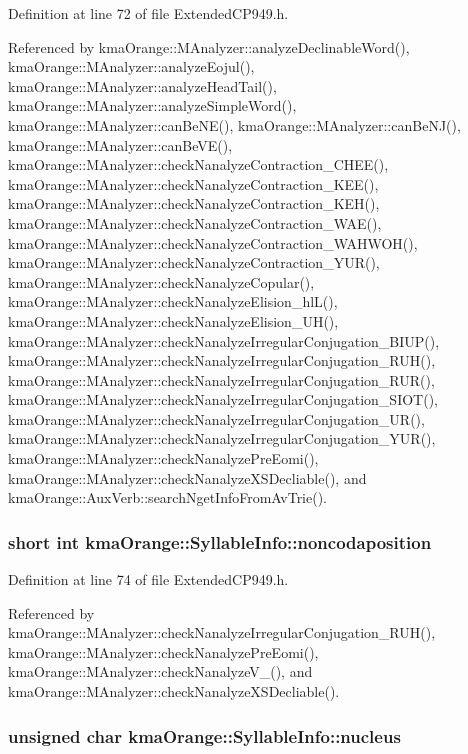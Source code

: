 Definition at line 72 of file ExtendedCP949.h.

Referenced by kmaOrange::MAnalyzer::analyzeDeclinableWord(), kmaOrange::MAnalyzer::analyzeEojul(), kmaOrange::MAnalyzer::analyzeHeadTail(), kmaOrange::MAnalyzer::analyzeSimpleWord(), kmaOrange::MAnalyzer::canBeNE(), kmaOrange::MAnalyzer::canBeNJ(), kmaOrange::MAnalyzer::canBeVE(), kmaOrange::MAnalyzer::checkNanalyzeContraction\_\-CHEE(), kmaOrange::MAnalyzer::checkNanalyzeContraction\_\-KEE(), kmaOrange::MAnalyzer::checkNanalyzeContraction\_\-KEH(), kmaOrange::MAnalyzer::checkNanalyzeContraction\_\-WAE(), kmaOrange::MAnalyzer::checkNanalyzeContraction\_\-WAHWOH(), kmaOrange::MAnalyzer::checkNanalyzeContraction\_\-YUR(), kmaOrange::MAnalyzer::checkNanalyzeCopular(), kmaOrange::MAnalyzer::checkNanalyzeElision\_\-hlL(), kmaOrange::MAnalyzer::checkNanalyzeElision\_\-UH(), kmaOrange::MAnalyzer::checkNanalyzeIrregularConjugation\_\-BIUP(), kmaOrange::MAnalyzer::checkNanalyzeIrregularConjugation\_\-RUH(), kmaOrange::MAnalyzer::checkNanalyzeIrregularConjugation\_\-RUR(), kmaOrange::MAnalyzer::checkNanalyzeIrregularConjugation\_\-SIOT(), kmaOrange::MAnalyzer::checkNanalyzeIrregularConjugation\_\-UR(), kmaOrange::MAnalyzer::checkNanalyzeIrregularConjugation\_\-YUR(), kmaOrange::MAnalyzer::checkNanalyzePreEomi(), kmaOrange::MAnalyzer::checkNanalyzeXSDecliable(), and kmaOrange::AuxVerb::searchNgetInfoFromAvTrie().\hypertarget{structkmaOrange_1_1SyllableInfo_53cf76e4408d6e2ae9f2eb8579164f5d}{
\subsubsection[{noncodaposition}]{\setlength{\rightskip}{0pt plus 5cm}short int {\bf kmaOrange::SyllableInfo::noncodaposition}}}
\label{structkmaOrange_1_1SyllableInfo_53cf76e4408d6e2ae9f2eb8579164f5d}




Definition at line 74 of file ExtendedCP949.h.

Referenced by kmaOrange::MAnalyzer::checkNanalyzeIrregularConjugation\_\-RUH(), kmaOrange::MAnalyzer::checkNanalyzePreEomi(), kmaOrange::MAnalyzer::checkNanalyzeV\_\-(), and kmaOrange::MAnalyzer::checkNanalyzeXSDecliable().\hypertarget{structkmaOrange_1_1SyllableInfo_17ae21365151c3aa679c71b6808465fd}{
\subsubsection[{nucleus}]{\setlength{\rightskip}{0pt plus 5cm}unsigned char {\bf kmaOrange::SyllableInfo::nucleus}}}
\label{structkmaOrange_1_1SyllableInfo_17ae21365151c3aa679c71b6808465fd}




